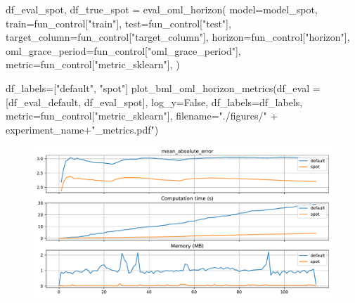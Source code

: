 \documentclass[
  letterpaper,
  DIV=11,
  numbers=noendperiod]{scrreprt}
\newenvironment{Shaded}{\begin{snugshade}}{\end{snugshade}}
\newcommand{\NormalTok}[1]{\textcolor[rgb]{0.00,0.23,0.31}{#1}}
\newcommand{\OperatorTok}[1]{\textcolor[rgb]{0.37,0.37,0.37}{#1}}
\newcommand{\StringTok}[1]{\textcolor[rgb]{0.13,0.47,0.30}{#1}}
\newcommand{\VariableTok}[1]{\textcolor[rgb]{0.07,0.07,0.07}{#1}}
\begin{document}
\begin{Shaded}
\begin{Highlighting}[]
\NormalTok{df\_eval\_spot, df\_true\_spot }\OperatorTok{=}\NormalTok{ eval\_oml\_horizon(}
\NormalTok{                    model}\OperatorTok{=}\NormalTok{model\_spot,}
\NormalTok{                    train}\OperatorTok{=}\NormalTok{fun\_control[}\StringTok{"train"}\NormalTok{],}
\NormalTok{                    test}\OperatorTok{=}\NormalTok{fun\_control[}\StringTok{"test"}\NormalTok{],}
\NormalTok{                    target\_column}\OperatorTok{=}\NormalTok{fun\_control[}\StringTok{"target\_column"}\NormalTok{],}
\NormalTok{                    horizon}\OperatorTok{=}\NormalTok{fun\_control[}\StringTok{"horizon"}\NormalTok{],}
\NormalTok{                    oml\_grace\_period}\OperatorTok{=}\NormalTok{fun\_control[}\StringTok{"oml\_grace\_period"}\NormalTok{],}
\NormalTok{                    metric}\OperatorTok{=}\NormalTok{fun\_control[}\StringTok{"metric\_sklearn"}\NormalTok{],}
\NormalTok{                )}
\end{Highlighting}
\end{Shaded}

\begin{Shaded}
\begin{Highlighting}[]
\NormalTok{df\_labels}\OperatorTok{=}\NormalTok{[}\StringTok{"default"}\NormalTok{, }\StringTok{"spot"}\NormalTok{]}
\NormalTok{plot\_bml\_oml\_horizon\_metrics(df\_eval }\OperatorTok{=}\NormalTok{ [df\_eval\_default, df\_eval\_spot], log\_y}\OperatorTok{=}\VariableTok{False}\NormalTok{, df\_labels}\OperatorTok{=}\NormalTok{df\_labels, metric}\OperatorTok{=}\NormalTok{fun\_control[}\StringTok{"metric\_sklearn"}\NormalTok{], filename}\OperatorTok{=}\StringTok{"./figures/"} \OperatorTok{+}\NormalTok{ experiment\_name}\OperatorTok{+}\StringTok{"\_metrics.pdf"}\NormalTok{)}
\end{Highlighting}
\end{Shaded}

\begin{figure}[H]

{\centering \includegraphics{13_spot_hpt_river_files/figure-pdf/cell-34-output-1.pdf}

}

\end{figure}
\end{document}
